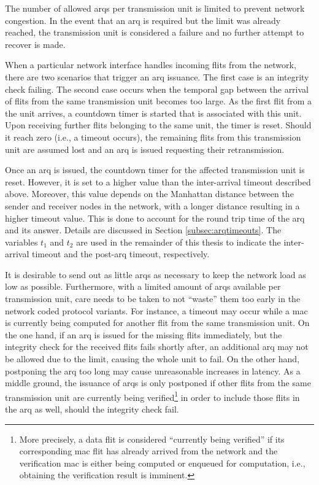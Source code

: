 The number of allowed \glspl{arq} per transmission unit is limited to prevent network congestion. In the event that an \gls{arq} is required but the limit
was already reached, the transmission unit is considered a failure and no further attempt to recover is made.

When a particular network interface handles incoming flits from the network, there are two scenarios that trigger an \gls{arq} issuance. The first
case is an integrity check failing. The second case occurs when the temporal gap between the arrival of flits from the same transmission unit becomes
too large. As the first flit from a the unit arrives, a countdown timer is started that is associated with this unit. Upon receiving further flits
belonging to the same unit, the timer is reset. Should it reach zero (i.e., a timeout occurs), the remaining flits from this transmission unit are
assumed lost and an \gls{arq} is issued requesting their retransmission.

Once an \gls{arq} is issued, the countdown timer for the affected transmission unit is reset. However, it is set to a higher value than the
inter-arrival timeout described above. Moreover, this value depends on the Manhattan distance between the sender and receiver nodes in the network,
with a longer distance resulting in a higher timeout value. This is done to account for the round trip time of the \gls{arq} and its
answer. Details are discussed in Section \ref{subsec:arqtimeouts}. The variables $t_1$ and $t_2$ are used in the remainder of this thesis to indicate
the inter-arrival timeout and the post-\gls{arq} timeout, respectively.

It is desirable to send out as little \glspl{arq} as necessary to keep the network load as low as possible. Furthermore, with a limited
amount of \glspl{arq} available per transmission unit, care needs to be taken to not \enquote{waste} them too early in the network coded protocol
variants. For instance, a timeout may
occur while a \gls{mac} is currently being computed for another flit from the same transmission unit. On the one hand, if an \gls{arq} is issued for
the missing flits immediately, but the integrity check for the received flits fails shortly after, an additional \gls{arq} may not be allowed due to
the limit, causing the whole unit to fail. On the other hand, postponing the \gls{arq} too long may cause unreasonable increases in latency. As a
middle ground, the issuance of \glspl{arq} is only postponed if other flits from the same transmission unit are currently being verified\footnote{More
precisely, a data flit is considered \enquote{currently being verified} if its corresponding \gls{mac} flit has already arrived from the network and
the verification \gls{mac} is either being computed or enqueued for computation, i.e., obtaining the verification result is imminent.} in order to
include those flits in the \gls{arq} as well, should the integrity check fail.

